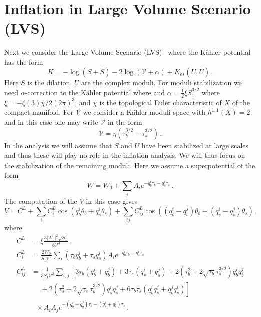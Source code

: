 \documentclass[12pt]{article}
\begin{document}
\section{Inflation in Large Volume Scenario (LVS) \label{sec:LVS}}
Next we consider the Large Volume Scenario (LVS)~\cite{Balasubramanian:2005zx} where the K\"ahler potential has the form
\begin{equation}
  K = - \log\left(S + \bar S\right)
      - 2 \log\left(\mathcal{V} + \alpha\right)
      + K_{cs}\left(U, \bar U\right)\,.
\end{equation}
Here $S$ is the dilation, $U$ are the complex moduli.
For moduli stabilization we need $\alpha$-correction to the K\"ahler potential where and $\alpha = \frac{1}{2} \xi S_1^{3 / 2}$ where $\xi = -\zeta\left(3\right) \chi / 2 \left(2 \pi\right)^3$, and $\chi$ is the topological Euler characteristic of $X$ of the compact manifold.
For $\mathcal{V}$ we consider a K\"ahler moduli space with $h^{1, 1}\left(X\right) = 2$ and in this case one may write $\mathcal{V}$ in the form
\begin{equation}
  \mathcal{V} = \eta \left(\tau_b^{3 / 2} - \tau_s^{3 / 2}\right)\,.
\end{equation}
In the analysis we will assume that $S$ and $U$ have been stabilized at large scales and thus these will play no role in the inflation analysis.
We will thus focus on the stabilization of the remaining moduli.
Here we assume a superpotential of the form
\begin{equation}
  W = W_0 + \sum_i A_i e^{-q^i_b \tau_b - q^i_s \tau_s}\,.
\end{equation}
The computation of the $V$ in this case gives
\begin{equation}
  V = C^L
    + \sum_i C^L_i \cos\left(q_b^i \theta_b + q^i_s \theta_s\right)
    + \sum_{ij} C^L_{ij} \cos\left(
        \left(q_b^i - q_b^j\right) \theta_b
      + \left(q_s^i - q_s^j\right) \theta_s
    \right)\,,
\end{equation}
where
\begin{equation}
    \begin{aligned}
    C^L &= \xi \frac{3 \left|W_0\right|^2 \sqrt{S_1}}{8 \mathcal{V}^3}\,,\\
    C^L_i &= \frac{2 W_0}{S_1 \mathcal{V}^2} \sum_i \left(\tau_b q_b^i + \tau_s q_s^i\right) A_i
        e^{-q_b^i \tau_b - q_s^i \tau_s}\,\\
    C^L_{ij} &= \frac{1}{3 S_1 \mathcal{V}^2} \sum_{i, j} \left[
        3 \tau_b \left(q^i_b + q^j_b\right)
        + 3 \tau_s \left(q_s^i + q_s^j\right)
        + 2 \left(\tau_b^2 + 2 \sqrt{\tau_b} \tau_s^{3 / 2}\right) q_b^i q_b^j\right.\\
        &~~~~~~ \left.{}
        + 2 \left(\tau^2_s + 2 \sqrt{\tau_s} \tau^{3 / 2}_b\right) q_s^i q_s^j
        + 6 \tau_b \tau_s \left(q_b^i q_s^j + q_b^j q_s^i\right)
    \right]\\
    &~~~ \times A_i A_j
        e^{-\left(q_b^i + q_b^j\right) \tau_b - \left(q_s^i + q_s^j\right) \tau_s}\,.
    \end{aligned}
\end{equation}
\end{document}
